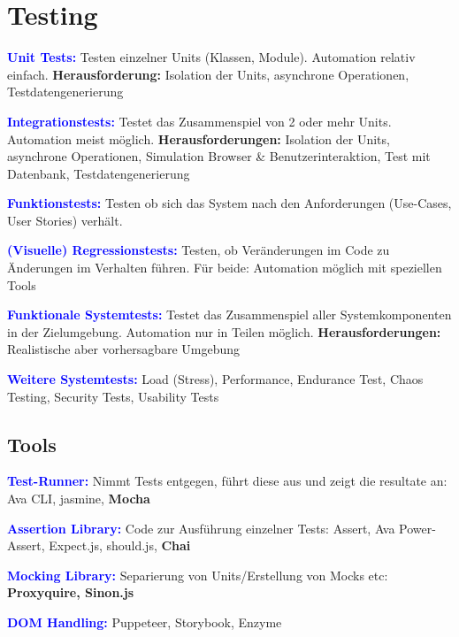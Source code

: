 
\section{Testing}
\textbf{\textcolor{blue}{Unit Tests:}} Testen einzelner Units (Klassen, Module). Automation relativ einfach. \textbf{Herausforderung:} Isolation der Units, asynchrone Operationen, Testdatengenerierung

\textbf{\textcolor{blue}{Integrationstests:}} Testet das Zusammenspiel von 2 oder mehr Units. Automation meist möglich. \textbf{Herausforderungen:} Isolation der Units, asynchrone Operationen, Simulation Browser \& Benutzerinteraktion, Test mit Datenbank, Testdatengenerierung

\textbf{\textcolor{blue}{Funktionstests:}} Testen ob sich das System nach den Anforderungen (Use-Cases, User Stories) verhält.

\textbf{\textcolor{blue}{(Visuelle) Regressionstests:}}
Testen, ob Veränderungen im Code zu Änderungen im Verhalten führen. Für beide: Automation möglich mit speziellen Tools

\textbf{\textcolor{blue}{Funktionale Systemtests:}} Testet das Zusammenspiel aller Systemkomponenten in der Zielumgebung. Automation nur in Teilen möglich. \textbf{Herausforderungen:} Realistische aber vorhersagbare Umgebung

\textbf{\textcolor{blue}{Weitere Systemtests:}} Load (Stress), Performance, Endurance Test, Chaos Testing, Security Tests, Usability Tests

\subsection{Tools}
\textbf{\textcolor{blue}{Test-Runner:}} Nimmt Tests entgegen, führt diese aus und zeigt die resultate an: Ava CLI, jasmine, \textbf{Mocha}

\textbf{\textcolor{blue}{Assertion Library:}} Code zur Ausführung einzelner Tests: Assert, Ava Power-Assert, Expect.js, should.js, \textbf{Chai}

\textbf{\textcolor{blue}{Mocking Library:}} Separierung von Units/Erstellung von Mocks etc: \textbf{Proxyquire, Sinon.js}

\textbf{\textcolor{blue}{DOM Handling:}} Puppeteer, Storybook, Enzyme
